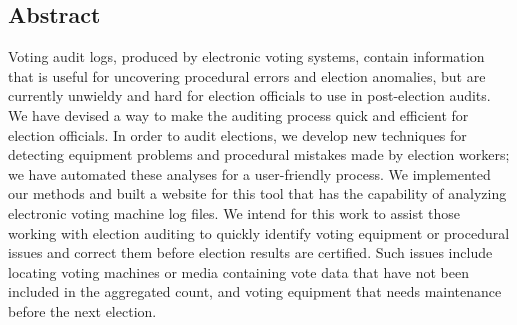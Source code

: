 
\subsection*{Abstract}
Voting audit logs, produced by electronic voting systems, contain information that is useful for uncovering procedural errors and election anomalies, but are currently unwieldy and hard for election officials to use in post-election audits.  We have devised a way to make the auditing process quick and efficient for election officials.  In order to audit elections, we develop new techniques for detecting equipment problems and procedural mistakes made by election workers; we have automated these analyses for a user-friendly process.  We implemented our methods and built a website for this tool that has the capability of analyzing electronic voting machine log files.  We intend for this work to assist those working with election auditing to quickly identify voting equipment or procedural issues and correct them before election results are certified.  Such issues include locating voting machines or media containing vote data that have not been included in the aggregated count, and voting equipment that needs maintenance before the next election.
